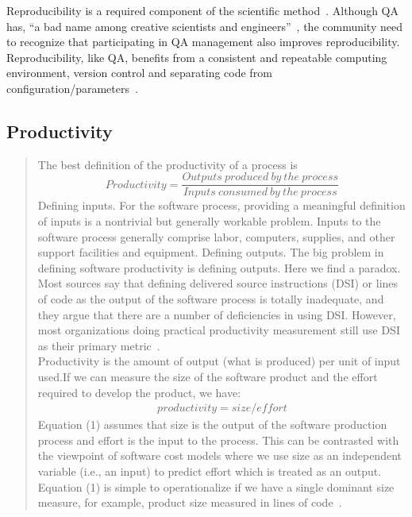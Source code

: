 \documentclass[letterpaper,cleveref]{lipics-v2019}
\begin{document}
Reproducibility is a required component of the scientific
method~\cite{Davison2012}.  Although QA has, ``a bad name among creative
scientists and engineers''~\cite[p.~352]{Roache1998}, the community need to
recognize that participating in QA management also improves reproducibility.
Reproducibility, like QA, benefits from a consistent and repeatable computing
environment, version control and separating code from
configuration/parameters~\cite{Davison2012}.

\subsection{Productivity}

\begin{quotation}
    The best definition of the productivity of a process is
    \[Productivity = \dfrac{Outputs\ produced\ by\ the\ process}{Inputs\ consumed\ by\ the\ process}\]
    Defining inputs. For the software process, providing a meaningful definition of inputs is a nontrivial but generally workable problem. Inputs to the software process generally comprise labor, computers, supplies, and other support facilities and equipment. Defining outputs. The big problem in defining software productivity is defining outputs. Here we find a paradox. Most sources say that defining delivered source instructions (DSI) or lines of code as the output of the software process is totally inadequate, and they argue that there are a number of deficiencies in using DSI. However, most organizations doing practical productivity measurement still use DSI as their primary metric~\cite{Boehm1987}.\\

    \smallskip
    Productivity is the amount of output (what is produced) per unit of input used.If we can measure the size of the software product and the effort required to develop the product, we have:
    \begin{align}
        productivity = size/effort
    \end{align}
    Equation (1) assumes that size is the output of the software production process and effort is the input to the process. This can be contrasted with the viewpoint of software cost models where we use size as an independent variable (i.e., an input) to predict effort which is treated as an output. Equation (1) is simple to operationalize if we have a single dominant size measure, for example, product size measured in lines of code~\cite{Kitchenham2004}.
\end{quotation}
\end{document}
